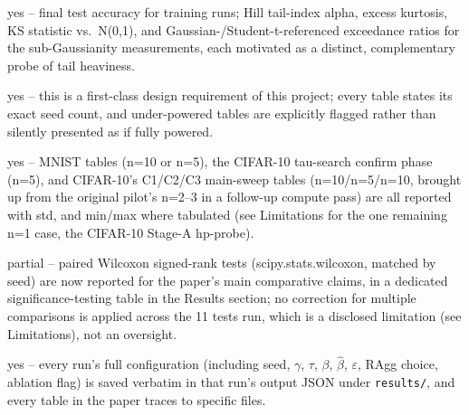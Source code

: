 \documentclass[letterpaper]{article}
\begin{document}
\begin{itemize}
\begin{itemize}
	yes -- final test accuracy for training runs; Hill tail-index alpha, excess kurtosis, KS statistic vs.\ N(0,1), and Gaussian-/Student-t-referenced exceedance ratios for the sub-Gaussianity measurements, each motivated as a distinct, complementary probe of tail heaviness.

	yes -- this is a first-class design requirement of this project; every table states its exact seed count, and under-powered tables are explicitly flagged rather than silently presented as if fully powered.

	yes -- MNIST tables (n=10 or n=5), the CIFAR-10 tau-search confirm phase (n=5), and CIFAR-10's C1/C2/C3 main-sweep tables (n=10/n=5/n=10, brought up from the original pilot's n=2--3 in a follow-up compute pass) are all reported with std, and min/max where tabulated (see Limitations for the one remaining n=1 case, the CIFAR-10 Stage-A hp-probe).

	partial -- paired Wilcoxon signed-rank tests (scipy.stats.wilcoxon, matched by seed) are now reported for the paper's main comparative claims, in a dedicated significance-testing table in the Results section; no correction for multiple comparisons is applied across the 11 tests run, which is a disclosed limitation (see Limitations), not an oversight.

	yes -- every run's full configuration (including seed, $\gamma$, $\tau$, $\beta$, $\hat\beta$, $\varepsilon$, RAgg choice, ablation flag) is saved verbatim in that run's output JSON under \texttt{results/}, and every table in the paper traces to specific files.

\end{itemize}
\end{itemize}
\ifreproStandalone
\end{document}
